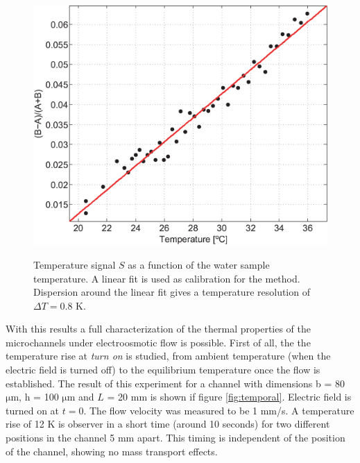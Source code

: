 \documentclass[twocolumn]{svjour3}       %
\begin{document}
\begin{figure}[h!]
\centering
\includegraphics[width=\columnwidth]{figs/calib.eps}
\label{fig:calib}
\caption{Temperature signal $S$ as a function of the water sample temperature. A linear fit is used as calibration for the method. Dispersion around the linear fit gives a temperature resolution of $\Delta T = 0.8$ K.}
\end{figure}

With this results a full characterization of the thermal properties of the microchannels under electroosmotic flow is possible. First of all, the the temperature rise at \textit{turn on} is studied, from ambient temperature (when the electric field is turned off) to the equilibrium temperature once the flow is established. The result of this experiment for a channel with dimensions b = 80 $\mathrm{\mu m}$, h = 100 $\mathrm{\mu m}$ and $L$ = 20 mm is shown if figure \ref{fig:temporal}. Electric field is turned on at $t = 0$. The flow velocity was measured to be 1 mm/s. A temperature rise of 12 K is observer in a short time (around 10 seconds) for two different positions in the channel 5 mm apart. This timing is independent of the position of the channel, showing no mass transport effects.
\end{document}
